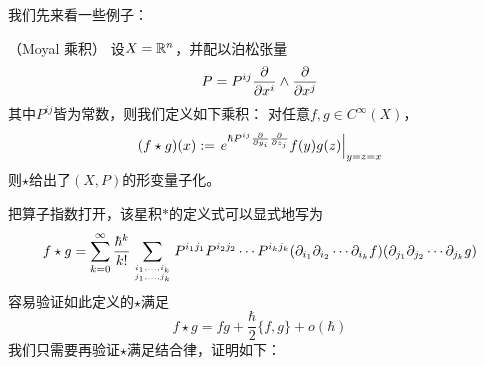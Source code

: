 


我们先来看一些例子：


\begin{Example}（Moyal 乘积）
设$X=\mathbb{R}^n$，并配以泊松张量
$$P=P^{ij}\frac{\partial } {\partial x^i}\wedge\frac{\partial } {\partial x^j}$$
其中$P^{ij}$皆为常数，则我们定义如下乘积：
对任意$f,g\in C^{\infty}(X)$，
$$(f\star g)(x):=
  \left.
    e^{
        \hbar P^{ij}
        \frac{\partial}{\partial y_i}
        \frac{\partial}{\partial z_j}
      }
    f(y)g(z)
  \right|_{y=z=x}$$
则$\star$给出了$(X,P)$的形变量子化。
\end{Example}
把算子指数打开，该星积$*$的定义式可以显式地写为
$$
  f\star g
=
  \sum_{k=0}^{\infty}
    \frac{\hbar^k}{k!}
    \sum_{i_1,...,i_k
          \atop
          j_1,...,j_k
         }
      P^{i_1j_1}P^{i_2j_2}\cdots P^{i_kj_k}
      (\partial_{i_1}\partial_{i_2}\cdots\partial_{i_k}f)
      (\partial_{j_1}\partial_{j_2}\cdots\partial_{j_k}g)
$$
容易验证如此定义的$\star$满足
$$f\star g=fg+\frac{\hbar}{2}\{f,g\}+o(\hbar)$$
我们只需要再验证$\star$满足结合律，证明如下：


